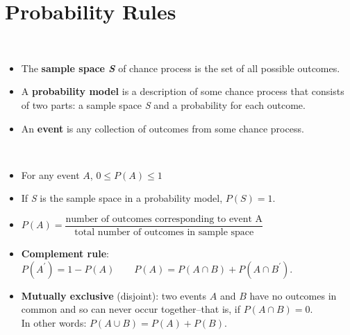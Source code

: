 \documentclass[Main.tex]{subfiles}
\begin{document}
	\section{Probability Rules}
	
	\begin{example} \hfill \\
		\begin{itemize}	
			\item The \textbf{sample space \emph{S}} of chance process is the set of all possible outcomes.\\
			\item A \textbf{probability model} is a description of some chance process that consists of two parts: a sample space \emph{S} and a probability for each outcome.\\
			\item An \textbf{event} is any collection of outcomes from some chance process.
		\end{itemize}
	\end{example}	
	
	\begin{example} \hfill \\
		\begin{itemize}	
			\item For any event $A$, $0\leqslant P(A)\leqslant1$\\
			\item If \emph{S} is the sample space in a probability model, $P(S)=1$.\\
			\item $P(A)=\dfrac{\text{number of outcomes corresponding to event A}}{\text{total number of outcomes in sample space}}$\\
			\item \textbf{Complement rule}: $P(A^{\prime})=1-P(A)\qquad P(A)=P(A\cap B)+P(A\cap B^{\prime}).$\\
			\item \textbf{Mutually exclusive} (disjoint): two events $A$ and $B$ have no outcomes in common and so can never occur together--that is, if $P(A\cap B)=0$.\\
			In other words:	$P(A\cup B)=P(A)+P(B)$.
		\end{itemize}
	\end{example}	
	
\end{document}
